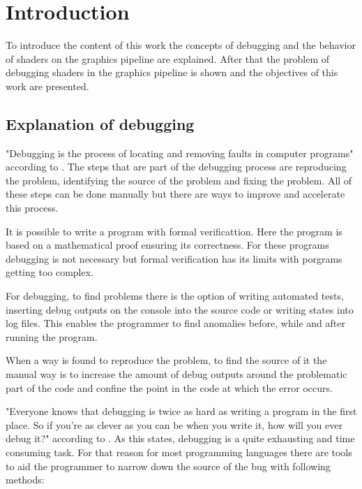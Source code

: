 
\chapter{Introduction}\label{cha:Introduction}

To introduce the content of this work the concepts of debugging and the behavior of shaders on the graphics pipeline are explained. After that the problem of debugging shaders in the graphics pipeline is shown and the objectives of this work are presented.

\section{Explanation of debugging}
\label{paragraph:debuging}

"Debugging is the process of locating and removing faults in computer programs" according to . The steps that are part of the debugging process are reproducing the problem, identifying the source of the problem and fixing the problem. All of these steps can be done manually but there are ways to improve and accelerate this process.

It is possible to write a program with formal verificattion. Here the program is based on a mathematical proof ensuring its correctness. For these programs debugging is not necessary but formal verification has its limits with porgrams getting too complex. 

For debugging, to find problems there is the option of writing automated tests, inserting debug outputs on the console into the source code or writing states into log files. This enables the programmer to find anomalies before, while and after running the program.

When a way is found to reproduce the problem, to find the source of it the manual way is to increase the amount of debug outputs around the problematic part of the code and confine the point in the code at which the error occurs.

"Everyone knows that debugging is twice as hard as writing a program in the first place. So if you're as clever as you can be when you write it, how will you ever debug it?" according to . As this states, debugging is a quite exhausting and time consuming task. For that reason for most programming languages there are tools to aid the programmer to narrow down the source of the bug with following methods:

